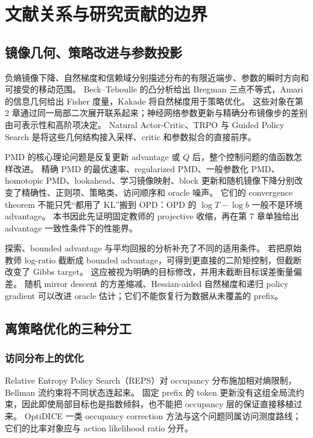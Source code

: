 \chapter{文献关系与研究贡献的边界}

\section{镜像几何、策略改进与参数投影}
负熵镜像下降、自然梯度和信赖域分别描述分布的有限近端步、参数的瞬时方向和可接受的移动范围。
Beck--Teboulle 的凸分析给出 Bregman 三点不等式，Amari 的信息几何给出 Fisher 度量，Kakade 将自然梯度用于策略优化。
这些对象在第 2 章通过同一局部二次展开联系起来；神经网络参数更新与精确分布镜像步的差别由可表示性和高阶项决定。
Natural Actor-Critic、TRPO 与 Guided Policy Search 是将这些几何结构接入采样、critic 和参数拟合的直接前序\cite{beck2003,amari1998,kakade01,peters08,trpo15,gps16}。

PMD 的核心理论问题是反复更新 advantage 或 $Q$ 后，整个控制问题的值函数怎样改进。
精确 PMD 的最优速率、regularized PMD、一般参数化 PMD、homotopic PMD、lookahead、学习镜像映射、block 更新和随机镜像下降分别改变了精确性、正则项、策略类、访问顺序和 oracle 噪声\cite{lan23,zhan2022,ding23,alfano23,homotopic22,lookahead24,learnmap24,block22,smd22}。
它们的 convergence theorem 不能只凭“都用了 KL”搬到 OPD：OPD 的 $\log T-\log b$ 一般不是环境 advantage。
本书因此先证明固定教师的 projective 收缩，再在第 7 章单独给出 advantage 一致性条件下的性能界。

探索、bounded advantage 与平均回报的分析补充了不同的适用条件\cite{explore25,mdac25,ngmd23,onpg23,bregman21}。
若把原始教师 log-ratio 截断成 bounded advantage，可得到更直接的二阶矩控制，但截断改变了 Gibbs target。
这应被视为明确的目标修改，并用未截断目标误差衡量偏差。
随机 mirror descent 的方差缩减、Hessian-aided 自然梯度和递归 policy gradient 可以改进 oracle 估计\cite{vrsm22,hvrng24,recursivepg19}；它们不能恢复行为数据从未覆盖的 prefix。

\section{离策略优化的三种分工}
\subsection{访问分布上的优化}
Relative Entropy Policy Search（REPS）对 occupancy 分布施加相对熵限制，Bellman 流约束将不同状态连起来\cite{reps10}。
固定 prefix 的 token 更新没有这组全局流约束，因此即使局部目标也是指数倾斜，也不能把 occupancy 层的保证直接移植过来。
OptiDICE 一类 occupancy correction 方法与这个问题同属访问测度路线；它们的比率对象应与 action likelihood ratio 分开。

